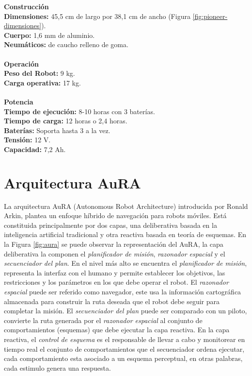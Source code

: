 \documentclass[11pt,twoside,A5]{article}
\newcommand{\reffigure}[1]{Figura \ref{#1}}
\newcommand{\refpfigure}[1]{(\reffigure{#1})}
\begin{document}
\noindent\textbf{Construcción}
\\
\indent\textbf{Dimensiones:} 45,5 cm de largo por 38,1 cm de ancho \refpfigure{fig:pioneer-dimensiones}.
\\
\indent\textbf{Cuerpo:} 1,6 mm de aluminio.
\\
\indent\textbf{Neumáticos:} de caucho relleno de goma.
\\\\
\noindent\textbf{Operación}
\\
\indent\textbf{Peso del Robot:} 9 kg.
\\
\indent\textbf{Carga operativa:} 17 kg.
\\\\
\noindent\textbf{Potencia}
\\
\indent\textbf{Tiempo de ejecución:} 8-10 horas con 3 baterías.
\\
\indent\textbf{Tiempo de carga:} 12 horas o 2,4 horas.
\\
\indent\textbf{Baterías:} Soporta hasta 3 a la vez.
\\
\indent\textbf{Tensión:} 12 V.
\\
\indent\textbf{Capacidad:} 7,2 Ah.



\section*{Arquitectura AuRA}

La arquitectura AuRA \cite{arkin1997} (Autonomous Robot Architecture) introducida por Ronald Arkin, plantea un enfoque híbrido
de navegación para robots móviles. Está constituida principalmente por dos capas, una deliberativa basada en la inteligencia artificial
tradicional y otra reactiva basada en teoría de esquemas. En la \reffigure{fig:aura} se puede observar la representación del AuRA, 
la capa deliberativa la componen el \textit{planificador de misión}, \textit{razonador espacial} y el \textit{secuenciador del plan}. En el nivel más alto se encuentra el \textit{planificador de misión}, representa la interfaz con el humano y permite establecer los objetivos, 
las restricciones y los parámetros en los que debe operar el robot. El \textit{razonador espacial} puede ser referido como navegador, este usa la información cartográfica
almacenada para construir la ruta deseada que el robot debe seguir para completar la misión. El \textit{secuenciador del plan}
puede ser comparado con un piloto, convierte la ruta generada por el \textit{razonador espacial} al conjunto de comportamientos (esquemas) que debe ejecutar la capa reactiva. En la capa reactiva, el \textit{control de esquema} es el responsable de llevar a cabo y monitorear en tiempo real el conjunto de comportamientos que el secuenciador ordena ejecutar, cada comportamiento esta asociado a un esquema perceptual, en otras palabras, cada estimulo genera una respuesta. 
\end{document}

